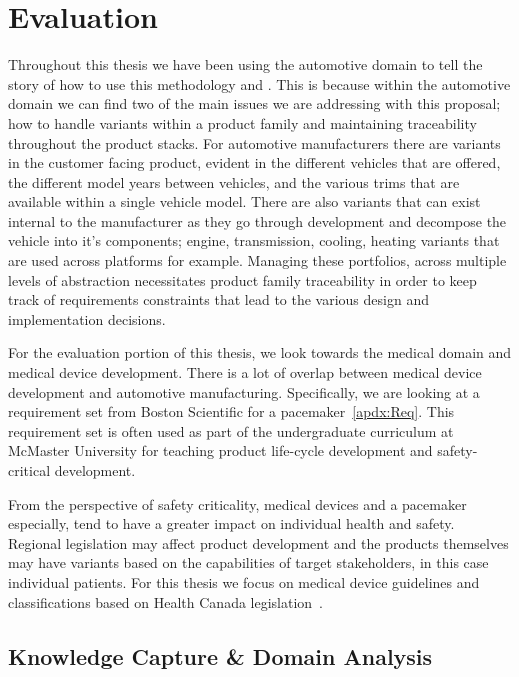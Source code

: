 \chapter{Evaluation}

Throughout this thesis we have been using the automotive domain to tell the story of how to use this methodology and \tool. This is because within the automotive domain we can find two of the main issues we are addressing with this proposal; how to handle variants within a product family and maintaining traceability throughout the product stacks. For automotive manufacturers there are variants in the customer facing product, evident in the different vehicles that are offered, the different model years between vehicles, and the various trims that are available within a single vehicle model. There are also variants that can exist internal to the manufacturer as they go through development and decompose the vehicle into it's components; engine, transmission, cooling, heating variants that are used across platforms for example. Managing these portfolios, across multiple levels of abstraction necessitates product family traceability in order to keep track of requirements constraints that lead to the various design and implementation decisions. 

For the evaluation portion of this thesis, we look towards the medical domain and medical device development. There is a lot of overlap between medical device development and automotive manufacturing. Specifically, we are looking at a requirement set from Boston Scientific for a pacemaker~\ref{apdx:Req}. This requirement set is often used as part of the undergraduate curriculum at McMaster University for teaching product life-cycle development and safety-critical development.

From the perspective of safety criticality, medical devices and a pacemaker especially, tend to have a greater impact on individual health and safety. Regional legislation may affect product development and the products themselves may have variants based on the capabilities of target stakeholders, in this case individual patients. For this thesis we focus on medical device guidelines and classifications based on Health Canada legislation~\cite{CanadaGuidanceDocument}. 

\section{Knowledge Capture \& Domain Analysis}

